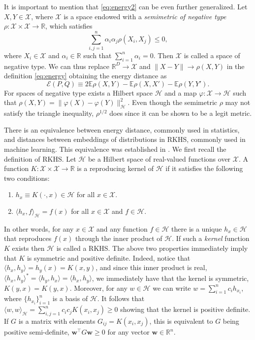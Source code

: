 \documentclass[aps,preprint,nofootinbib,floatfix]{revtex4-1}
\newcommand\Energy{\mathcal{E}}
\newcommand\E{\mathbb{E}}
\newcommand\kk{K}
\newcommand\kkk{h}
\newcommand\HH{\mathcal{H}}
\begin{document}
It is important to 
mention that \eqref{eq:energy2} can be even further generalized.
Let $X, Y \in \mathcal{X}$,  where $\mathcal{X}$ is a space endowed
with a \emph{semimetric of negative type}
$\rho: \mathcal{X}\times\mathcal{X} \to \mathbb{R}$, which satisfies
\begin{equation}
\label{eq:negative_type}
\sum_{i,j=1}^n \alpha_i \alpha_j \rho(X_i, X_j) \le 0,
\end{equation}
where $X_i \in \mathcal{X}$ and $\alpha_i \in \mathbb{R}$ such that
$\sum_{i=1}^n \alpha_i = 0$. Then $\mathcal{X}$ is called a space of
negative type.
We can thus replace $\mathbb{R}^D \to \mathcal{X}$ and 
$\| X - Y \| \to \rho(X , Y)$ in the definition \eqref{eq:energy} obtaining
the energy distance as
\begin{equation}\label{eq:energy3}
\Energy(P, Q) \equiv 2 \E \rho(X,Y) - \E \rho(X, X') - \E \rho(Y,Y').
\end{equation}
For spaces of negative type exists a Hilbert space $\mathcal{H}$ and
a map $\varphi: \mathcal{X} \to
\mathcal{H}$ such that
$\rho(X, Y) = \| \varphi(X) - \varphi(Y) \|_{\mathcal{H}}^2$. 
Even though the semimetric 
$\rho$ may not satisfy the triangle inequality, 
$\rho^{1/2}$ does since it can be shown to be a legit metric. 

There is an equivalence between energy distance, 
commonly used in statistics,
and distances between embeddings of distributions in 
RKHS, commonly used in machine learning. 
This equivalence was established
in \cite{Sejdinovic2013}. We first recall the definition of
RKHS. Let $\HH$ be a Hilbert space of real-valued functions
over $\mathcal{X}$. A function 
$\kk : \mathcal{X} \times \mathcal{X} \to 
\mathbb{R}$ is a reproducing kernel of $\HH$ if it satisfies
the following two conditions:
\begin{enumerate}
\item $\kkk_x \equiv \kk(\cdot, x) \in \HH$ 
for all $x \in \mathcal{X}$.
\item $\langle \kkk_x, f \rangle_{\HH} = f(x)$ for
all $x\in\mathcal{X}$ and $f\in \HH$.
\end{enumerate}
In other words, for any $x \in \mathcal{X}$ and any function $f \in \HH$ 
there is a unique 
$\kkk_x \in \HH$ that reproduces $f(x)$ through the inner product
of $\HH$.
If such a \emph{kernel} 
function $\kk$ exists then $\HH$ is called a RKHS. The above two 
properties immediately imply that $\kk$ is symmetric and positive
definite. Indeed, notice that
$\langle \kkk_x, \kkk_y \rangle = \kkk_y(x) = \kk(x,y)$, and since
this inner product is real,
$\langle \kkk_x, \kkk_y \rangle^* = \langle \kkk_y, \kkk_x \rangle = 
\langle \kkk_x, \kkk_y \rangle$, we immediately have that
the kernel is symmetric,
$\kk(y,x) = \kk(y,x)$. Moreover, for any $w \in
\HH$ we can write $w = \sum_{i=1}^n c_i \kkk_{x_i}$, where
$\{ \kkk_{x_i} \}_{i=1}^n$ is a basis of $\HH$. It follows that
$\langle w, w \rangle_{\HH}  = \sum_{i,j=1}^n c_i c_j \kk(x_i,x_j) \ge 0$
showing that the kernel is positive definite. If $G$ is a matrix with
elements $G_{ij} = \kk(x_i,x_j)$, this is equivalent to $G$ being
positive semi-definite, $\bm{w}^\top G \bm{w} \ge 0$ for any vector
$\bm{w} \in \mathbb{R}^n$.
\end{document}
